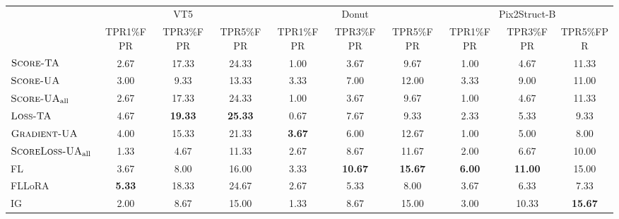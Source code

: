 \begin{table}[t]
\begin{center}
\begin{small}
\begin{adjustbox}{width=1\textwidth}
\small
\begin{tabular}{lccccccccc}
\toprule
 & \multicolumn{3}{c}{VT5} & \multicolumn{3}{c}{Donut} & \multicolumn{3}{c}{Pix2Struct-B} \\
\cmidrule(l){2-4}
\cmidrule(l){5-7}
\cmidrule(l){8-10}
 & TPR1\%FPR & TPR3\%FPR & TPR5\%FPR & TPR1\%FPR & TPR3\%FPR & TPR5\%FPR & TPR1\%FPR & TPR3\%FPR & TPR5\%FPR \\
\midrule
$\textsc{Score-TA}$ & 2.67 & 17.33 & 24.33 & 1.00 & 3.67 & 9.67 & 1.00 & 4.67 & 11.33 \\
$\textsc{Score-UA}$ & 3.00 & 9.33 & 13.33 & 3.33 & 7.00 & 12.00 & 3.33 & 9.00 & 11.00 \\
$\textsc{Score-UA}_{\text{all}}$ & 2.67 & 17.33 & 24.33 & 1.00 & 3.67 & 9.67 & 1.00 & 4.67 & 11.33 \\
\midrule
$\textsc{Loss-TA}$ & 4.67 & \textbf{19.33} & \textbf{25.33} & 0.67 & 7.67 & 9.33 & 2.33 & 5.33 & 9.33 \\
$\textsc{Gradient-UA}$ & 4.00 & 15.33 & 21.33 & \textbf{3.67} & 6.00 & 12.67 & 1.00 & 5.00 & 8.00 \\
$\textsc{ScoreLoss-UA}_{\text{all}}$ & 1.33 & 4.67 & 11.33 & 2.67 & 8.67 & 11.67 & 2.00 & 6.67 & 10.00 \\
\midrule
FL & 3.67 & 8.00 & 16.00 & 3.33 & \textbf{10.67} & \textbf{15.67} & \textbf{6.00} & \textbf{11.00} & 15.00 \\
FLLoRA & \textbf{5.33} & 18.33 & 24.67 & 2.67 & 5.33 & 8.00 & 3.67 & 6.33 & 7.33 \\
IG & 2.00 & 8.67 & 15.00 & 1.33 & 8.67 & 15.00 & 3.00 & 10.33 & \textbf{15.67} \\
\bottomrule
\end{tabular}
\end{adjustbox}
\end{small}
\end{center}
\vskip -0.1in
\caption{}
\label{tab:tpr@fpr_docvqa}
\end{table}
